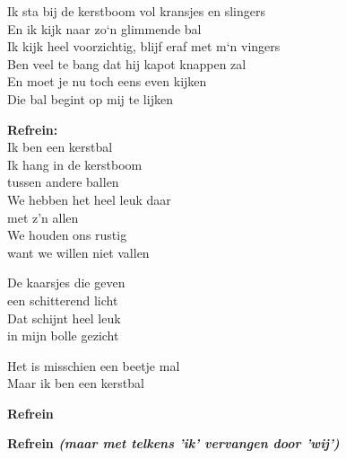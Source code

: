 Ik sta bij de kerstboom vol kransjes en slingers\\
En ik kijk naar zo`n glimmende bal\\
Ik kijk heel voorzichtig, blijf eraf met m`n vingers\\
Ben veel te bang dat hij kapot knappen zal\\
En moet je nu toch eens even kijken\\
Die bal begint op mij te lijken

\textbf{Refrein:}\\
Ik ben een kerstbal\\
Ik hang in de kerstboom\\
tussen andere ballen\\
We hebben het heel leuk daar\\
met z'n allen\\
We houden ons rustig\\
want we willen niet vallen

De kaarsjes die geven\\
een schitterend licht\\
Dat schijnt heel leuk\\
in mijn bolle gezicht

Het is misschien een beetje mal\\
Maar ik ben een kerstbal

\textbf{Refrein}

\textbf{Refrein \textit{(maar met telkens 'ik' vervangen door 'wij')}}
